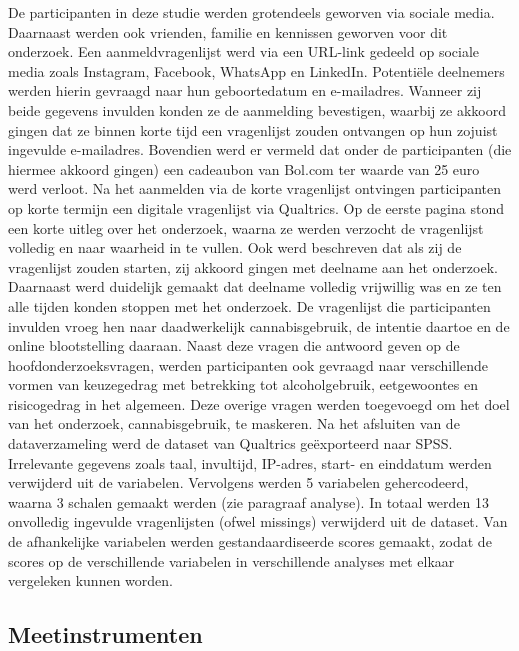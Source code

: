 \documentclass[
  letterpaper,
  DIV=11,
  numbers=noendperiod]{scrartcl}
\begin{document}
De participanten in deze studie werden grotendeels geworven via sociale
media. Daarnaast werden ook vrienden, familie en kennissen geworven voor
dit onderzoek. Een aanmeldvragenlijst werd via een URL-link gedeeld op
sociale media zoals Instagram, Facebook, WhatsApp en LinkedIn.
Potentiële deelnemers werden hierin gevraagd naar hun geboortedatum en
e-mailadres. Wanneer zij beide gegevens invulden konden ze de aanmelding
bevestigen, waarbij ze akkoord gingen dat ze binnen korte tijd een
vragenlijst zouden ontvangen op hun zojuist ingevulde e-mailadres.
Bovendien werd er vermeld dat onder de participanten (die hiermee
akkoord gingen) een cadeaubon van Bol.com ter waarde van 25 euro werd
verloot. Na het aanmelden via de korte vragenlijst ontvingen
participanten op korte termijn een digitale vragenlijst via Qualtrics.
Op de eerste pagina stond een korte uitleg over het onderzoek, waarna ze
werden verzocht de vragenlijst volledig en naar waarheid in te vullen.
Ook werd beschreven dat als zij de vragenlijst zouden starten, zij
akkoord gingen met deelname aan het onderzoek. Daarnaast werd duidelijk
gemaakt dat deelname volledig vrijwillig was en ze ten alle tijden
konden stoppen met het onderzoek. De vragenlijst die participanten
invulden vroeg hen naar daadwerkelijk cannabisgebruik, de intentie
daartoe en de online blootstelling daaraan. Naast deze vragen die
antwoord geven op de hoofdonderzoeksvragen, werden participanten ook
gevraagd naar verschillende vormen van keuzegedrag met betrekking tot
alcoholgebruik, eetgewoontes en risicogedrag in het algemeen. Deze
overige vragen werden toegevoegd om het doel van het onderzoek,
cannabisgebruik, te maskeren. Na het afsluiten van de dataverzameling
werd de dataset van Qualtrics geëxporteerd naar SPSS. Irrelevante
gegevens zoals taal, invultijd, IP-adres, start- en einddatum werden
verwijderd uit de variabelen. Vervolgens werden 5 variabelen
gehercodeerd, waarna 3 schalen gemaakt werden (zie paragraaf analyse).
In totaal werden 13 onvolledig ingevulde vragenlijsten (ofwel missings)
verwijderd uit de dataset. Van de afhankelijke variabelen werden
gestandaardiseerde scores gemaakt, zodat de scores op de verschillende
variabelen in verschillende analyses met elkaar vergeleken kunnen
worden.

\hypertarget{meetinstrumenten}{%
\subsection{Meetinstrumenten}\label{meetinstrumenten}}
\end{document}
